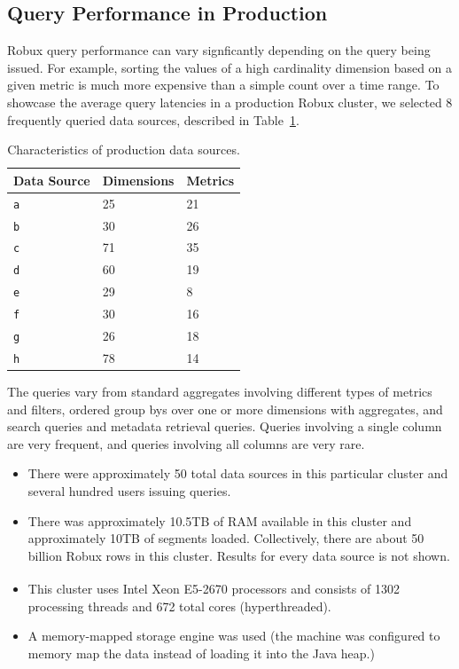 \documentclass{vldb}
\begin{document}
\subsection{Query Performance in Production}
Robux query performance can vary signficantly depending on the query being
issued. For example, sorting the values of a high cardinality dimension based
on a given metric is much more expensive than a simple count over a time range.
To showcase the average query latencies in a production Robux cluster, we
selected 8 frequently queried data sources, described in
Table~\ref{tab:datasources}.

\begin{table}
  \centering
  \scriptsize\begin{tabular}{| l | l | l |}
    \hline
    \textbf{Data Source} & \textbf{Dimensions} & \textbf{Metrics} \\ \hline
    \texttt{a} & 25 & 21 \\ \hline
    \texttt{b} & 30 & 26 \\ \hline
    \texttt{c} & 71 & 35 \\ \hline
    \texttt{d} & 60 & 19 \\ \hline
    \texttt{e} & 29 & 8 \\ \hline
    \texttt{f} & 30 & 16 \\ \hline
    \texttt{g} & 26 & 18 \\ \hline
    \texttt{h} & 78 & 14 \\ \hline
  \end{tabular}
  \normalsize
  \caption{Characteristics of production data sources.}
  \label{tab:datasources}
\end{table}

The queries vary from standard aggregates involving different types
of metrics and filters, ordered group bys over one or more
dimensions with aggregates, and search queries and metadata
retrieval queries. Queries involving a single column are very
frequent, and queries involving all columns are very rare.

\begin{itemize}[leftmargin=*,beginpenalty=5000,topsep=0pt]
\item There were
approximately 50 total data sources in this particular cluster and several hundred users issuing
queries.

\item There was approximately 10.5TB of RAM available in this cluster and
approximately 10TB of segments loaded. Collectively,
there are about 50 billion Robux rows in this cluster. Results for
every data source is not shown.

\item This cluster uses Intel\textsuperscript{\textregistered} Xeon\textsuperscript{\textregistered} E5-2670 processors and consists of 1302 processing
threads and 672 total cores (hyperthreaded).

\item A memory-mapped storage engine was used (the machine was configured to
    memory map the data instead of loading it into the Java heap.)
\end{itemize}
\end{document}

